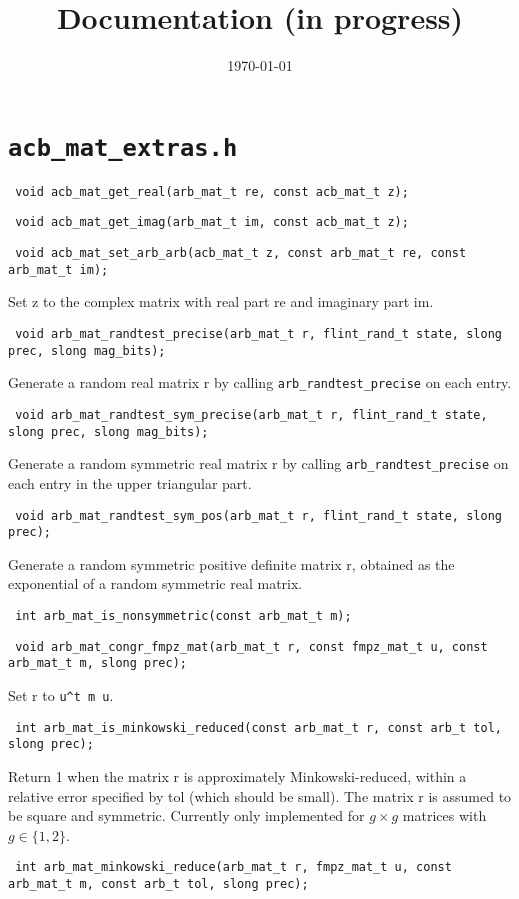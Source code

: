 \documentclass{article}
\title{Documentation (in progress)}
\date{\today}
\newcommand{\code}[1]{\lstinline:#1:}
\newcommand{\fun}[1]{\vspace{2mm}\noindent \code{#1}}
\begin{document}
\lstset{language=C,
  identifierstyle=\bfseries}

\maketitle

\section{\code{acb_mat_extras.h}}

\fun{
void
acb_mat_get_real(arb_mat_t re, const acb_mat_t z);
}

\fun{
void
acb_mat_get_imag(arb_mat_t im, const acb_mat_t z);
}

\fun{
void
acb_mat_set_arb_arb(acb_mat_t z, const arb_mat_t re, const arb_mat_t im);
}

Set z to the complex matrix with real part re and imaginary part im. 

\fun{
void
arb_mat_randtest_precise(arb_mat_t r, flint_rand_t state, slong prec, slong mag_bits);
}

Generate a random real matrix r by calling \code{arb_randtest_precise} on each entry.

\fun{
void
arb_mat_randtest_sym_precise(arb_mat_t r, flint_rand_t state, slong prec, slong mag_bits);
}

Generate a random symmetric real matrix r by calling
\fun{arb_randtest_precise} on each entry in the upper triangular
part.

\fun{
void
arb_mat_randtest_sym_pos(arb_mat_t r, flint_rand_t state, slong prec);
}

Generate a random symmetric positive definite matrix r, obtained as
the exponential of a random symmetric real matrix.

\fun{
int
arb_mat_is_nonsymmetric(const arb_mat_t m);
}

\fun{
void
arb_mat_congr_fmpz_mat(arb_mat_t r, const fmpz_mat_t u, const arb_mat_t m, slong prec);
}

Set r to \code{u^t m u}.

\fun{
int
arb_mat_is_minkowski_reduced(const arb_mat_t r, const arb_t tol, slong prec);
}

Return 1 when the matrix r is approximately Minkowski-reduced, within
a relative error specified by tol (which should be small). The matrix
r is assumed to be square and symmetric. Currently only implemented
for $g\times g$ matrices with $g\in\{1,2\}$.

\fun{
int
arb_mat_minkowski_reduce(arb_mat_t r, fmpz_mat_t u, const arb_mat_t m,
const arb_t tol, slong prec);
}
\end{document}
